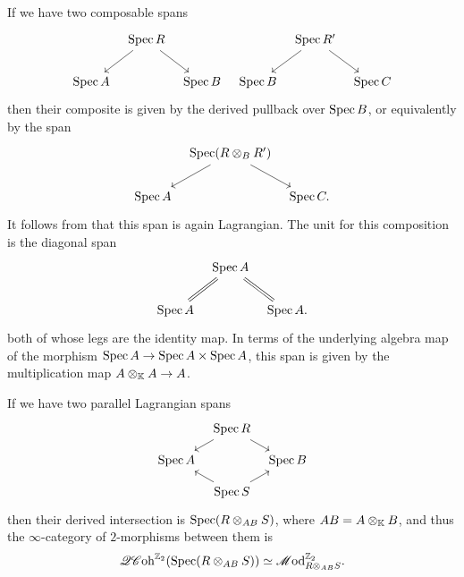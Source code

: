 If we have two composable spans
\begin{equation*}
	\begin{tikzcd}[column sep = tiny]
		& \Spec R \ar[dl] \ar[dr] & & & \Spec R' \ar[dl] \ar[dr] \\
		\Spec A & & \Spec B & \Spec B & & \Spec C
	\end{tikzcd}
\end{equation*}
then their composite is given by the derived pullback over $\operatorname{Spec} B$, or equivalently by the span
\begin{equation*}
	\begin{tikzcd}[column sep = tiny]
		& \Spec (R \otimes_B R') \ar[dl] \ar[dr] & \\
		\Spec A & & \Spec C.
	\end{tikzcd}
\end{equation*}
It follows from \cite[Theorem 4.4]{Calaque2015} that this span is again Lagrangian. The unit for this composition is the diagonal span
\begin{equation*}
	\begin{tikzcd}[column sep = tiny]
		& \Spec A \ar[dl, equal] \ar[dr, equal] & \\
		\Spec A & & \Spec A.
	\end{tikzcd}
\end{equation*}
both of whose legs are the identity map. In terms of the underlying algebra map of the morphism $\operatorname{Spec} A \to \operatorname{Spec} A \times \operatorname{Spec} A$, this span is given by the multiplication map $A \otimes_{\mathbb{K}} A \to A$. 

If we have two parallel Lagrangian spans
\begin{equation*}
	\begin{tikzcd}[row sep = small, column sep = tiny]
		& \Spec R \ar[dl] \ar[dr] & \\
		\Spec A & & \Spec B \\
		& \Spec S \ar[ul] \ar[ur] & 
	\end{tikzcd}
\end{equation*}
then their derived intersection is $\operatorname{Spec} (R \otimes_{AB} S)$, where $AB = A \otimes_{\mathbb{K}} B$, and thus the $\infty$-category of $2$-morphisms between them is 
\begin{equation} \label{eqn:cat-of-2-morphisms}
	\mathscr{QC}\mathrm{oh}^{\mathbb{Z}_2}(\operatorname{Spec} (R \otimes_{AB} S)) \simeq \mathscr{M}\mathrm{od}^{\mathbb{Z}_2}_{R \otimes_{AB} S}.
\end{equation}

